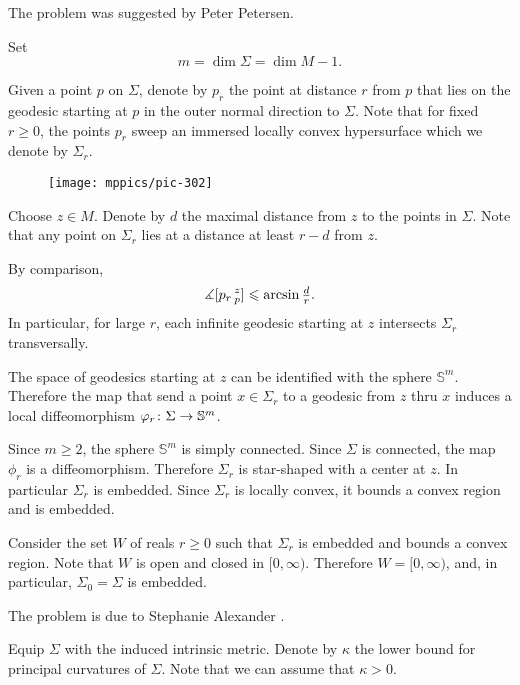 The problem was suggested by Peter Petersen.



Set 
\[m=\dim \Sigma=\dim M-1.\]

Given a point $p$ on $\Sigma$, denote by $p_r$ the point at distance $r$ from $p$
that lies on the geodesic starting at $p$ in the outer normal direction to $\Sigma$.
Note that for fixed $r\ge 0$,
the points $p_r$ sweep an immersed locally convex hypersurface which we denote by $\Sigma_r$.

\begin{wrapfigure}{o}{61 mm}
\vskip-2mm
\centering
\texttt{[image: mppics/pic-302]}
\end{wrapfigure}

Choose $z\in M$. 
Denote by $d$ the maximal distance from $z$ to the points in $\Sigma$.
Note that 
any point on $\Sigma_r$
lies at a distance at least $r-d$ from $z$.

By comparison, 
\[\measuredangle[p_r\,{}^{z}_{p}]\leqslant \arcsin\tfrac dr.\]
In particular, for large $r$, 
each infinite geodesic starting at $z$ intersects $\Sigma_r$ transversally.

The space of geodesics starting at $z$ can be identified with the sphere $\mathbb{S}^m$.
Therefore the map that send a point $x\in \Sigma_r$ to a geodesic from $z$ thru $x$ induces a local diffeomorphism $\phi_r\:\Sigma\z\to\mathbb{S}^m$.

Since $m\ge 2$, the sphere $\mathbb{S}^m$ is simply connected.
Since $\Sigma$ is connected, the map $\phi_r$ is a diffeomorphism.
Therefore $\Sigma_r$ is star-shaped with a center at $z$.
In particular $\Sigma_r$ is embedded.
Since $\Sigma_r$ is locally convex, it bounds a convex region and is embedded.

Consider the set $W$ of reals $r\ge 0$ such that $\Sigma_r$ is embedded and bounds a convex region.
Note that $W$ is open and closed in $[0,\infty)$.
Therefore $W=[0,\infty)$, and, in particular, $\Sigma_0=\Sigma$ is embedded.\qeds

The problem is due to Stephanie Alexander \cite{alexander}.



Equip $\Sigma$ with the induced intrinsic metric.
Denote by $\kappa$ the lower bound for principal curvatures of $\Sigma$.
Note that we can assume that $\kappa>0$.

